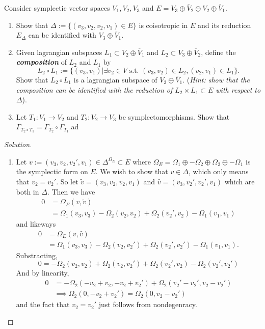 Consider symplectic vector spaces  $V_1,V_2,V_3$ and $E=V_3\oplus \overline{ V}_{2}\oplus V_2\oplus \overline{V}_1$.
\begin{enumerate}[label=\alph*.]
	\item Show that $\Delta :=\{(v_3,v_2,v_2,v_1)\in E\} $ is coisotropic in $E$ and its reduction $E_{\Delta}$ can be identified with $V_3\oplus \overline{V}_{1}$.

	\item Given lagrangian subspaces $L_1\subset V_2\oplus \overline{V}_{1}$ and $L_2\subset  V_3\oplus \overline{V}_{2}$, define the \textit{\textbf{composition}} of $L_2$ and $L_1$ by
		\[L_2\circ L_1:=\{(v_3,v_1)|\exists v_2\in V\text{ s.t. } (v_3,v_2)\in L_2,(v_2,v_1)\in L_1\}. \]
		Show that $L_2\circ L_1$ is a lagrangian subspace of $V_3\oplus \overline{V}_{1}$. (\textit{Hint: show that the composition can be identified with the reduction of $L_2\times L_1\subset E$ with respect to $\Delta$}).

	\item Let $T_1:V_1\to V_2$ and  $T_2:V_2\to V_3$ be symplectomorphisms. Show that $\Gamma_{T_2\circ T_1}=\Gamma_{T_2}\circ \Gamma_{T_1}$.ad
\end{enumerate}

\begin{proof}[Solution]\leavevmode
	\begin{enumerate}[label=\alph*.]
		\item Let $v:=(v_3,v_2,v_2',v_1)\in \Delta^{\Omega_E}\subset E$ where  $\Omega_E=\Omega_1\oplus -\Omega_2\oplus \Omega_2\oplus -\Omega_1$ is the symplectic form on $E$. We wish to show that $v\in \Delta$, which only means that $v_2=v_2'$. So let $\tilde{v}=(v_3,v_2,v_2,v_1)$ and $\hat{v}=(v_3,v_2',v_2',v_1)$ which are both in $\Delta$. Then we have
			\begin{align*}
				0&=\Omega_E(v,\tilde{v})\\
				& =\Omega_1(v_3,v_3)-\Omega_2(v_2,v_2)+\Omega_{2}(v_2',v_2)-\Omega_{1}(v_1,v_1)
			\end{align*}
and likeways
			\begin{align*}
				0&=\Omega_E(v,\hat{v})\\
				& =\Omega_1(v_3,v_3)-\Omega_2(v_2,v_2')+\Omega_{2}(v_2',v_2')-\Omega_{1}(v_1,v_1).
			\end{align*}
Substracting,
\[0=-\Omega_2(v_2,v_2)+\Omega_2(v_2,v_2')+\Omega_2(v_2',v_2)-\Omega_2(v_2',v_2')\]
And by linearity,
\begin{align*}
0&=-\Omega_2(-v_2+v_2,-v_2+v_2')+\Omega_2(v_2'-v_2',v_2-v_2')\\
&\implies \Omega_2(0,-v_2+v_2')=\Omega_2(0,v_2-v_2')
\end{align*}
 and the fact that $v_2=v_2'$ just follows from nondegenracy.



	\end{enumerate}
\end{proof}

